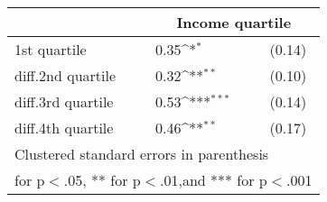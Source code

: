 {
\def\sym#1{\ifmmode^{#1}\else\(^{#1}\)\fi}
\begin{tabular*}{.5\hsize}{@{\hskip\tabcolsep\extracolsep\fill}l*{1}{lc}}
\toprule
                &\multicolumn{2}{c}{Income quartile}\\
\midrule
1st quartile    &     0.35\sym{*}  &   (0.14)\\
diff.2nd quartile&     0.32\sym{**} &   (0.10)\\
diff.3rd quartile&     0.53\sym{***}&   (0.14)\\
diff.4th quartile&     0.46\sym{**} &   (0.17)\\
\bottomrule
\multicolumn{3}{l}{\footnotesize Clustered standard errors in parenthesis}\\
\multicolumn{3}{l}{\footnotesize * for p$<$.05, ** for p$<$.01,and *** for p$<$.001}\\
\end{tabular*}
}
